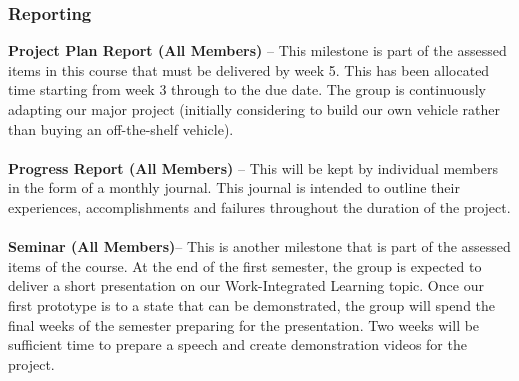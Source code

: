 \documentclass[8pt]{article}
\begin{document}
\subsubsection{Reporting}
\textbf{Project Plan Report (All Members)}  – This milestone is part of the assessed items in this course that must be delivered by week 5. This has been allocated time starting from week 3 through to the due date. The group is continuously adapting our major project (initially considering to build our own vehicle rather than buying an off-the-shelf vehicle).
\\\\
\textbf{Progress Report (All Members)} – This will be kept by individual members in the form of a monthly journal. This journal is intended to outline their experiences, accomplishments and failures throughout the duration of the project.
\\\\
\textbf{Seminar (All Members)}– This is another milestone that is part of the assessed items of the course. At the end of the first semester, the group is expected to deliver a short presentation on our Work-Integrated Learning topic. Once our first prototype is to a state that can be demonstrated, the group will spend the final weeks of the semester preparing for the presentation. Two weeks will be sufficient time to prepare a speech and create demonstration videos for the project.
\end{document}
